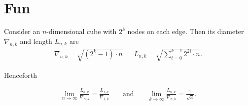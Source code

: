 \section{Fun}

Consider an $n$-dimensional cube with $2^k$ nodes on each edge. Then its diameter $\nabla_{n,k}$ and length $L_{n,k}$ are
\begin{align*}
\nabla_{n,k}=\sqrt{(2^k-1)\cdot n} && L_{n,k}=\sqrt{\sum_{i=0}^{k-1}2^{2i}\cdot n}.
\end{align*}

Henceforth

\begin{align*}
\lim_{n\to\infty}\frac{L_{n,k}}{\nabla_{n,k}}=\frac{L_{1,k}}{\nabla_{1,k}}&& \text{ and }&& \lim_{k\to\infty}\frac{L_{n,k}}{\nabla_{n,k}}=\frac{1}{\sqrt{3}}.
\end{align*}
